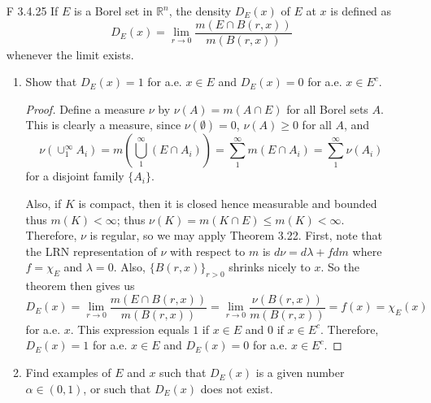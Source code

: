 \documentclass[10pt]{article}
\newcommand{\R}{\mathbb{R}}
\newcommand{\Int}{{\displaystyle \int}}
\begin{document}
\begin{enumerate}
\begin{proof}
Let $\epsilon > 0$.  Since $f$ is continuous, there is some $\delta$ such that if $y \in B_\delta$ (the ball of radius $\delta$ centered at $x$), then $|f(y) - f(x)| < \epsilon$.  So surely this holds if $y \in B_r$ and $0 < r < \delta$, in which case
$$
\frac{1}{m(B_r)} \Int_{B_r} |f(y) - f(x)|dy < \frac{1}{m(B_r)} m(B_r) \epsilon = \epsilon.
$$
So by definition, the limit mentioned in the definition of the Lebesgue set is $0$, thus $x$ is in the Lebesgue set of $f$.
\end{proof}

\item[F 3.4.25] If $E$ is a Borel set in $\R^n$, the density $D_E(x)$ of $E$ at $x$ is defined as
$$
D_E(x) = \lim_{r\rightarrow 0} \frac{m(E \cap B(r,x))}{m(B(r,x))}
$$
whenever the limit exists.
\begin{enumerate}
\item Show that $D_E(x) = 1$ for a.e. $x \in E$ and $D_E(x) = 0$ for a.e. $x \in E^c$.

\begin{proof}
Define a measure $\nu$ by $\nu(A) = m(A \cap E)$ for all Borel sets $A$.  This is clearly a measure, since $\nu(\emptyset) = 0$, $\nu(A) \geq 0$ for all $A$, and
$$
\nu(\cup_1^\infty A_i) = m(\bigcup_1^\infty (E \cap A_i)) = \sum_1^\infty m(E \cap A_i) = \sum_1^\infty \nu(A_i)
$$
for a disjoint family $\{A_i\}$.

Also, if $K$ is compact, then it is closed hence measurable and bounded thus $m(K) < \infty$; thus $\nu(K) = m(K \cap E) \leq m(K) < \infty$.  Therefore, $\nu$ is regular, so we may apply Theorem 3.22.  First, note that the LRN representation of $\nu$ with respect to $m$ is $d\nu = d\lambda + fdm$ where $f = \chi_E$ and $\lambda = 0$.  Also, $\{B(r,x)\}_{r>0}$ shrinks nicely to $x$.  So the theorem then gives us
$$
D_E(x) = \lim_{r \rightarrow 0} \frac{m(E \cap B(r,x))}{m(B(r,x))} = \lim_{r \rightarrow 0} \frac{\nu(B(r,x))}{m(B(r,x))} = 
 f(x) = \chi_E(x)
$$
for a.e. $x$.  This expression equals $1$ if $x \in E$ and $0$ if $x \in E^c$.  Therefore, $D_E(x) = 1$ for a.e. $x \in E$ and $D_E(x) = 0$ for a.e. $x \in E^c$.
\end{proof}

\item Find examples of $E$ and $x$ such that $D_E(x)$ is a given number $\alpha \in (0,1)$, or such that $D_E(x)$ does not exist.


\end{enumerate}
\end{enumerate}
\end{document}
